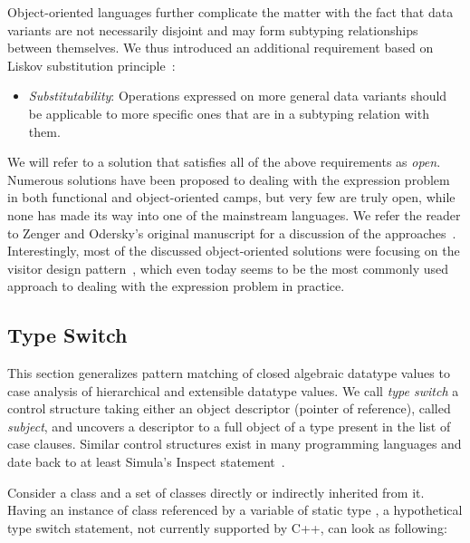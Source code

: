 \noindent
Object-oriented languages further complicate the matter with the fact that 
data variants are not necessarily disjoint and may form subtyping relationships  
between themselves. We thus introduced an additional requirement based on 
Liskov substitution principle~\cite{Lis87}:

\begin{itemize}
\setlength{\itemsep}{0pt}
\setlength{\parskip}{0pt}
\item \emph{Substitutability}: Operations expressed on more general data variants
      should be applicable to more specific ones that are in a subtyping relation 
      with them.
\end{itemize}


\noindent
We will refer to a solution that satisfies all of the above requirements as \emph{open}. 
Numerous solutions have been proposed to dealing with the expression problem in both 
functional and object-oriented camps, but very few are truly open, while 
none has made its way into one of the mainstream languages. We refer the reader 
to Zenger and Odersky's original manuscript for a discussion of the 
approaches~\cite{fool12}. Interestingly, most of the discussed object-oriented 
solutions were focusing on the visitor design pattern~\cite{DesignPatterns1993}, 
which even today seems to be the most commonly used approach to dealing with the 
expression problem in practice.

\subsection{Type Switch}

This section generalizes pattern matching of closed algebraic datatype values
to case analysis of hierarchical and extensible datatype values.
We call \emph{type switch} a control structure taking either an object
descriptor (pointer of reference), called \emph{subject}, and uncovers a 
descriptor to a full object of a type present in the list of case 
clauses. Similar control structures exist in many programming languages and 
date back to at least Simula's Inspect statement~\cite{Simula67}.

Consider a class  and a set of classes  directly 
or indirectly inherited from it. Having an instance of class  referenced 
by a variable  of static type , a hypothetical type switch 
statement, not currently supported by C++, can look as following:

